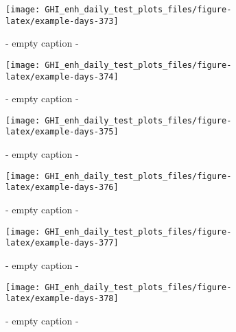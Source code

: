 \documentclass[
  10pt,
  a4paper,oneside]{article}
\begin{document}
\begin{figure}[H]

{\centering \texttt{[image: GHI\_enh\_daily\_test\_plots\_files/figure-latex/example-days-373]} 

}

\caption{ - empty caption - }\label{fig:example-days-373}
\end{figure}

\begin{figure}[H]

{\centering \texttt{[image: GHI\_enh\_daily\_test\_plots\_files/figure-latex/example-days-374]} 

}

\caption{ - empty caption - }\label{fig:example-days-374}
\end{figure}

\begin{figure}[H]

{\centering \texttt{[image: GHI\_enh\_daily\_test\_plots\_files/figure-latex/example-days-375]} 

}

\caption{ - empty caption - }\label{fig:example-days-375}
\end{figure}

\begin{figure}[H]

{\centering \texttt{[image: GHI\_enh\_daily\_test\_plots\_files/figure-latex/example-days-376]} 

}

\caption{ - empty caption - }\label{fig:example-days-376}
\end{figure}

\begin{figure}[H]

{\centering \texttt{[image: GHI\_enh\_daily\_test\_plots\_files/figure-latex/example-days-377]} 

}

\caption{ - empty caption - }\label{fig:example-days-377}
\end{figure}

\begin{figure}[H]

{\centering \texttt{[image: GHI\_enh\_daily\_test\_plots\_files/figure-latex/example-days-378]} 

}

\caption{ - empty caption - }\label{fig:example-days-378}
\end{figure}
\end{document}
